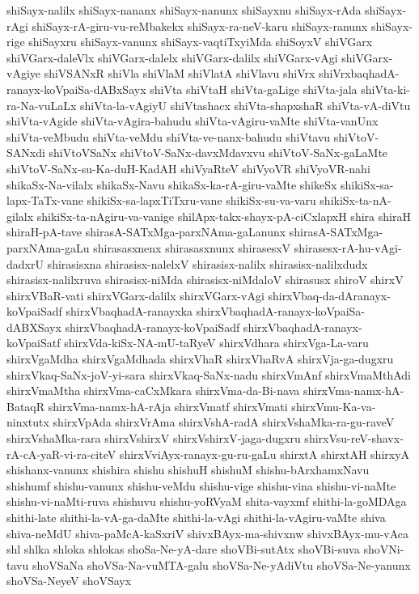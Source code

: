 {shiSayx-nalilx
shiSayx-nananx
shiSayx-nanunx
shiSayxnu
shiSayx-rAda
shiSayx-rAgi
shiSayx-rA-giru-vu-reMbakekx
shiSayx-ra-neV-karu
shiSayx-ranunx
shiSayx-rige
shiSayxru
shiSayx-vanunx
shiSayx-vaqtiTxyiMda
shiSoyxV
shiVGarx
shiVGarx-daleVlx
shiVGarx-dalelx
shiVGarx-dalilx
shiVGarx-vAgi
shiVGarx-vAgiye
shiVSANxR
shiVla
shiVlaM
shiVlatA
shiVlavu
shiVrx
shiVrxbaqhadA-ranayx-koVpaiSa-dABxSayx
shiVta
shiVtaH
shiVta-gaLige
shiVta-jala
shiVta-ki-ra-Na-vuLaLx
shiVta-la-vAgiyU
shiVtashacx
shiVta-shapxshaR
shiVta-vA-diVtu
shiVta-vAgide
shiVta-vAgira-bahudu
shiVta-vAgiru-vaMte
shiVta-vanUnx
shiVta-veMbudu
shiVta-veMdu
shiVta-ve-nanx-bahudu
shiVtavu
shiVtoV-SANxdi
shiVtoVSaNx
shiVtoV-SaNx-davxMdavxvu
shiVtoV-SaNx-gaLaMte
shiVtoV-SaNx-su-Ka-duH-KadAH
shiVyaRteV
shiVyoVR
shiVyoVR-nahi
shikaSx-Na-vilalx
shikaSx-Navu
shikaSx-ka-rA-giru-vaMte
shikeSx
shikiSx-sa-lapx-TaTx-vane
shikiSx-sa-lapxTiTxru-vane
shikiSx-su-va-varu
shikiSx-ta-nA-gilalx
shikiSx-ta-nAgiru-va-vanige
shilApx-takx-shayx-pA-ciCxlapxH
shira
shiraH
shiraH-pA-tave
shirasA-SATxMga-parxNAma-gaLanunx
shirasA-SATxMga-parxNAma-gaLu
shirasasxnenx
shirasasxnunx
shirasesxV
shirasesx-rA-hu-vAgi-dadxrU
shirasisxna
shirasisx-nalelxV
shirasisx-nalilx
shirasisx-nalilxdudx
shirasisx-nalilxruva
shirasisx-niMda
shirasisx-niMdaloV
shirasusx
shiroV
shirxV
shirxVBaR-vati
shirxVGarx-dalilx
shirxVGarx-vAgi
shirxVbaq-da-dAranayx-koVpaiSadf
shirxVbaqhadA-ranayxka
shirxVbaqhadA-ranayx-koVpaiSa-dABXSayx
shirxVbaqhadA-ranayx-koVpaiSadf
shirxVbaqhadA-ranayx-koVpaiSatf
shirxVda-kiSx-NA-mU-taRyeV
shirxVdhara
shirxVga-La-varu
shirxVgaMdha
shirxVgaMdhada
shirxVhaR
shirxVhaRvA
shirxVja-ga-dugxru
shirxVkaq-SaNx-joV-yi-sara
shirxVkaq-SaNx-nadu
shirxVmAnf
shirxVmaMthAdi
shirxVmaMtha
shirxVma-caCxMkara
shirxVma-da-Bi-nava
shirxVma-namx-hA-BataqR
shirxVma-namx-hA-rAja
shirxVmatf
shirxVmati
shirxVmu-Ka-va-ninxtutx
shirxVpAda
shirxVrAma
shirxVshA-radA
shirxVshaMka-ra-gu-raveV
shirxVshaMka-rara
shirxVshirxV
shirxVshirxV-jaga-dugxru
shirxVsu-reV-shavx-rA-cA-yaR-vi-ra-citeV
shirxVviAyx-ranayx-gu-ru-gaLu
shirxtA
shirxtAH
shirxyA
shishanx-vanunx
shishira
shishu
shishuH
shishuM
shishu-bArxhamxNavu
shishumf
shishu-vanunx
shishu-veMdu
shishu-vige
shishu-vina
shishu-vi-naMte
shishu-vi-naMti-ruva
shishuvu
shishu-yoRVyaM
shita-vayxmf
shithi-la-goMDAga
shithi-late
shithi-la-vA-ga-daMte
shithi-la-vAgi
shithi-la-vAgiru-vaMte
shiva
shiva-neMdU
shiva-paMcA-kaSxriV
shivxBAyx-ma-shivxnw
shivxBAyx-mu-vAca
shl
shlka
shloka
shlokas
shoSa-Ne-yA-dare
shoVBi-sutAtx
shoVBi-suva
shoVNi-tavu
shoVSaNa
shoVSa-Na-vuMTA-galu
shoVSa-Ne-yAdiVtu
shoVSa-Ne-yanunx
shoVSa-NeyeV
shoVSayx
}
